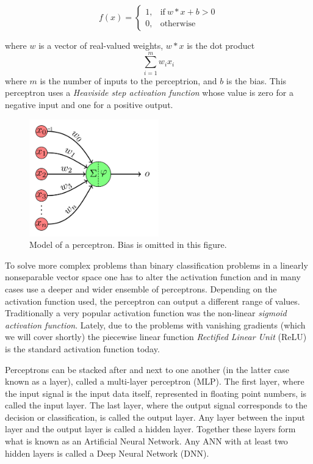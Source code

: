 \documentclass[english, bibtex]{kththesis}
\begin{document}
\begin{equation}
	f(x) = 
	    \begin{cases}
	      1, & \text{if}\ w * x + b > 0 \\
	      0, & \text{otherwise}
	    \end{cases}
  	\label{eqn:perceptron}
\end{equation}

where $w$ is a vector of real-valued weights, $w * x$ is the dot product \[\sum_{i=1}^{m} w_i x_i\] where $m$ is the number of inputs to the perceptrion, and $b$ is the bias. This perceptron uses a \textit{Heaviside step activation function} whose value is zero for a negative input and one for a positive output.

\begin{figure}[H]
  \begin{center}
    \includegraphics[width=0.5\textwidth]{figures/perceptron.png}
  \end{center}
  \caption{Model of a perceptron. Bias is omitted in this figure.}
  \label{fig:perceptron}
\end{figure}

To solve more complex problems than binary classification problems in a linearly nonseparable vector space one has to alter the activation function and in many cases use a deeper and wider ensemble of perceptrons. Depending on the activation function used, the perceptron can output a different range of values. Traditionally a very popular activation function was the non-linear \textit{sigmoid activation function}. Lately, due to the problems with vanishing gradients (which we will cover shortly) the piecewise linear function \textit{Rectified Linear Unit} (ReLU) is the standard activation function today.

Perceptrons can be stacked after and next to one another (in the latter case known as a layer), called a multi-layer perceptron (MLP). The first layer, where the input signal is the input data itself, represented in floating point numbers, is called the input layer. The last layer, where the output signal corresponds to the decision or classification, is called the output layer. Any layer between the input layer and the output layer is called a hidden layer. Together these layers form what is known as an Artificial Neural Network. Any ANN with at least two hidden layers is called a Deep Neural Network (DNN).
\end{document}
